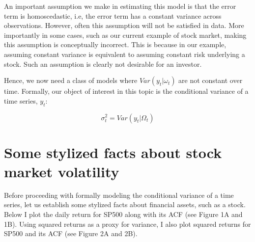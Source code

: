 \documentclass[]{book}
\theoremstyle{definition}
\theoremstyle{definition}
\theoremstyle{definition}
\theoremstyle{remark}
\begin{document}
An important assumption we make in estimating this model is that the error term is homoscedastic, i.e, the error term has a constant variance across observations. However, often this assumption will not be satisfied in data. More importantly in some cases, such as our current example of stock market, making this assumption is conceptually incorrect. This is because in our example, assuming constant variance is equivalent to assuming constant risk underlying a stock. Such an assumption is clearly not desirable for an investor.

Hence, we now need a class of models where \(Var(y_t|\omega_t)\) are not constant over time. Formally, our object of interest in this topic is the conditional variance of a time series, \(y_t\):

\[\sigma_t^2=Var(y_t|\Omega_t)\]

\hypertarget{some-stylized-facts-about-stock-market-volatility}{%
\section{Some stylized facts about stock market volatility}\label{some-stylized-facts-about-stock-market-volatility}}

Before proceeding with formally modeling the conditional variance of a time series, let us establish some stylized facts about financial assets, such as a stock. Below I plot the daily return for SP500 along with its ACF (see Figure 1A and 1B). Using squared returns as a proxy for variance, I also plot squared returns for SP500 and its ACF (see Figure 2A and 2B).
\end{document}
